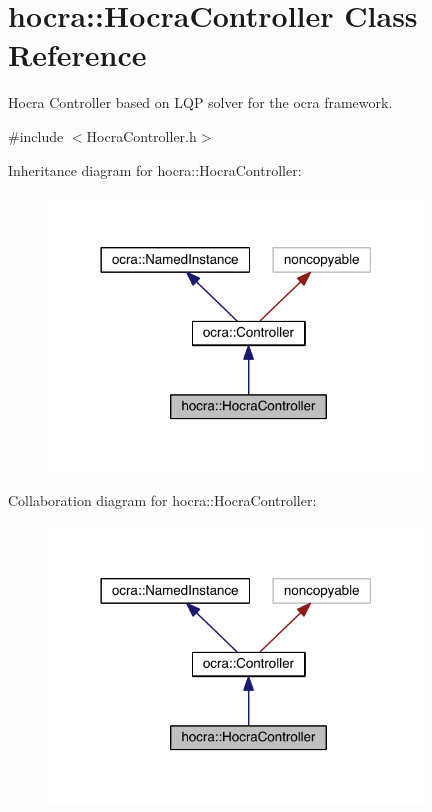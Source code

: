 \hypertarget{classhocra_1_1HocraController}{}\section{hocra\+:\+:Hocra\+Controller Class Reference}
\label{classhocra_1_1HocraController}


Hocra Controller based on L\+QP solver for the ocra framework.  




{\ttfamily \#include $<$Hocra\+Controller.\+h$>$}



Inheritance diagram for hocra\+:\+:Hocra\+Controller\+:\nopagebreak
\begin{figure}[H]
\begin{center}
\leavevmode
\includegraphics[width=282pt]{de/dc4/classhocra_1_1HocraController__inherit__graph}
\end{center}
\end{figure}


Collaboration diagram for hocra\+:\+:Hocra\+Controller\+:\nopagebreak
\begin{figure}[H]
\begin{center}
\leavevmode
\includegraphics[width=282pt]{df/d65/classhocra_1_1HocraController__coll__graph}
\end{center}
\end{figure}
